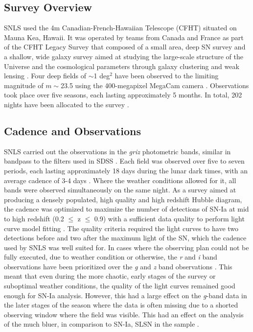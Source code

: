 \subsection{Survey Overview}
SNLS used the 4m Canadian-French-Hawaiian Telescope (CFHT) situated on Mauna Kea, Hawaii. It was operated by teams from Canada and France as part of the CFHT Legacy Survey that composed of a small area, deep SN survey and a shallow, wide galaxy survey aimed at studying the large-scale structure of the Universe and the cosmological parameters through galaxy clustering and weak lensing \citep{Pritchet2004,Astier2006}. Four deep fields of $\sim$1 deg$^2$ have been observed to the limiting magnitude of $m\sim$23.5 using the 400-megapixel MegaCam camera \citep{Boulade2003}. Observations took place over five seasons, each lasting approximately 5 months. In total, 202 nights have been allocated to the survey \citep{Pritchet2004}.

\subsection{Cadence and Observations}
SNLS carried out the observations in the \textit{griz} photometric bands, similar in bandpass to the filters used in SDSS . Each field was observed over five to seven periods, each lasting approximately 18 days during the lunar dark times, with an average cadence of 3-4 days \citep{Astier2006,Guy2010}. Where the weather conditions allowed for it, all bands were observed simultaneously on the same night. As a survey aimed at producing a densely populated, high quality and high redshift Hubble diagram, the cadence was optimized to maximize the number of detections of SN-Ia at mid to high redshift (0.2 $\leq$ z $\leq$ 0.9) with a sufficient data quality to perform light curve model fitting \citep{Pritchet2004}. The quality criteria required the light curves to have two detections before and two after the maximum light of the SN, which the cadence used by SNLS was well suited for. In cases where the observing plan could not be fully executed, due to weather condition or otherwise, the \textit{r} and \textit{i} band observations have been prioritized over the \textit{g} and \textit{z} band observations \citep{Guy2010}. This meant that even during the more chaotic, early stages of the survey or suboptimal weather conditions, the quality of the light curves remained good enough for SN-Ia analysis. However, this had a large effect on the \textit{g}-band data in the later stages of the season where the data is often missing due to a shorted observing window where the field was visible. This had an effect on the analysis of the much bluer, in comparison to SN-Ia, SLSN in the sample \citep{Prajs2016}.

